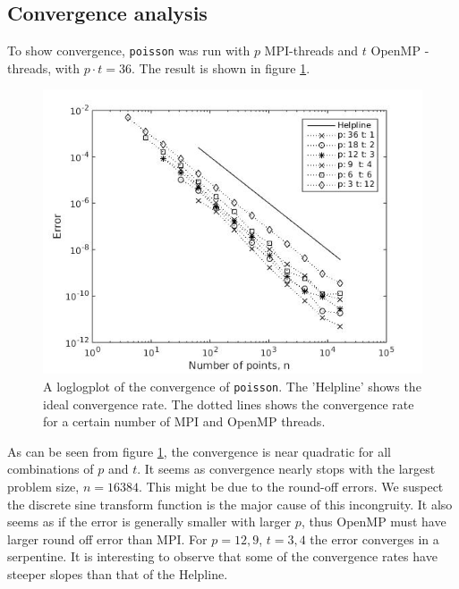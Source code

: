 \documentclass{article}
\begin{document}
\subsection{Convergence analysis}
To show convergence, \texttt{poisson} was run with $p$ MPI-threads and $t$ OpenMP -threads, with $p\cdot t = 36$. The result is shown in figure \ref{fig:conv}.
\begin{figure}[h]
    \centering
    \includegraphics[width = 0.6\linewidth]{conv}
    \caption{A loglogplot of the convergence of \texttt{poisson}. The 'Helpline' shows the ideal convergence rate. The dotted lines shows the convergence rate for a certain number of MPI and OpenMP threads.}
    \label{fig:conv}
\end{figure}
As can be seen from figure \ref{fig:conv}, the convergence is near quadratic for all combinations of $p$ and $t$. It seems as convergence nearly stops with the largest problem size, $n = 16384$. This might be due to the round-off errors. We suspect the discrete sine transform function is the major cause of this incongruity. It also seems as if the error is generally smaller with larger $p$, thus OpenMP must have larger round off error than MPI. For $p = 12,9$, $t=3,4$ the error converges in a serpentine. It is interesting to observe that some of the convergence rates have steeper slopes than that of the Helpline.
\end{document}
